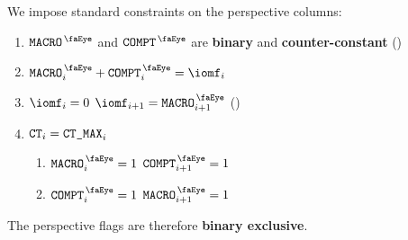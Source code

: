 We impose standard constraints on the perspective columns:
\begin{enumerate}
	\item $\isRlpUtilsMacro$ and $\isRlpUtilsCompt$ are \textbf{binary} and \textbf{counter-constant} \quad (\sanityCheck)
	\item $\isRlpUtilsMacro _{i} + \isRlpUtilsCompt _{i} = \iomf _{i}$
	\item \If $\iomf _{i} = 0$ \Then $\iomf _{i + 1} = \isRlpUtilsMacro _{i + 1}$ \quad (\trash)
	\item \If $\texttt{CT} _{i} = \texttt{CT\_MAX} _{i}$ \Then 
		\begin{enumerate}
			\item \If $\isRlpUtilsMacro _{i} = 1$ \Then $\isRlpUtilsCompt _{i + 1} = 1$
			\item \If $\isRlpUtilsCompt _{i} = 1$ \Then $\isRlpUtilsMacro _{i + 1} = 1$
		\end{enumerate}
\end{enumerate}
\saNote{}
The perspective flags are therefore
\textbf{binary exclusive}.
